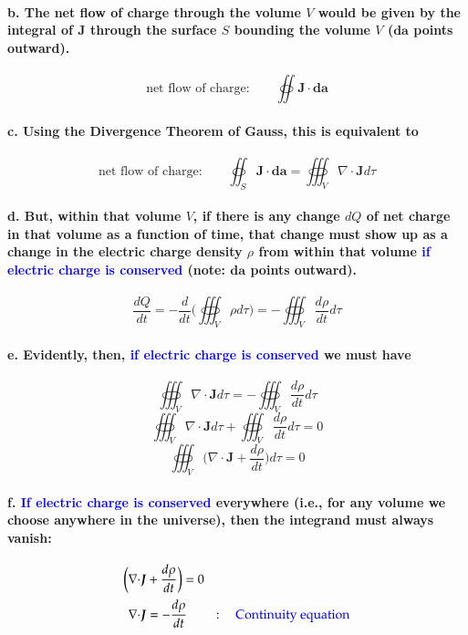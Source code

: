 \documentclass{article}
\begin{document}
\paragraph{\indent b. The net flow of charge through the volume $V$ would be given by the integral of $\boldsymbol{J}$ through the surface $S$ bounding the volume $V$ ($\boldsymbol{da}$ points outward).}
\begin{equation*}
    \text{net flow of charge:} \quad\quad \oiint \boldsymbol{J}\cdot\boldsymbol{da}
\end{equation*}
\paragraph{\indent c. Using the Divergence Theorem of Gauss, this is equivalent to }
\begin{equation*}
    \text{net flow of charge:}\quad\quad \oiint_S\boldsymbol{J}\cdot\boldsymbol{da}=\oiiint_V\nabla\cdot\boldsymbol{J}d\tau
\end{equation*} 
\paragraph{\indent d. But, within that volume $V$, if there is any change $dQ$ of net charge in that volume as a function of time, that change must show up as a change in the electric charge density $\rho$ from within that volume \textcolor{blue}{if electric charge is conserved} (note: $\boldsymbol{da}$ points outward).}
\begin{equation*}
    \frac{dQ}{dt}=-\frac{d}{dt}\bigg(\oiiint_V\rho d\tau\bigg)=-\oiiint_V\frac{d\rho}{dt}d\tau
\end{equation*}
\paragraph{\indent e. Evidently, then, \textcolor{blue}{if electric charge is conserved} we must have}
\begin{equation*}
    \oiiint_V\nabla\cdot\boldsymbol{J}d\tau=-\oiiint_V \frac{d\rho}{dt}d\tau
\end{equation*}
\begin{equation*}
    \oiiint_V \nabla\cdot\boldsymbol{J}d\tau+\oiiint_V \frac{d\rho}{dt}d\tau=0
\end{equation*}
\begin{equation*}
    \oiiint_V \bigg(\nabla\cdot\boldsymbol{J}+\frac{d\rho}{dt}\bigg)d\tau=0
\end{equation*}
\paragraph{\indent f. \textcolor{blue}{If electric charge is conserved} everywhere (i.e., for any volume we choose anywhere in the universe), then the integrand must always vanish:}
\begin{align*}
    \bigg(\nabla\cdot&\boldsymbol{J}+\frac{d\rho}{dt}\bigg)=0\\
    \nabla\cdot&\boldsymbol{J}=-\frac{d\rho}{dt}\quad\quad:\quad \text{\textcolor{blue}{Continuity equation}}\\
\end{align*}
\end{document}
